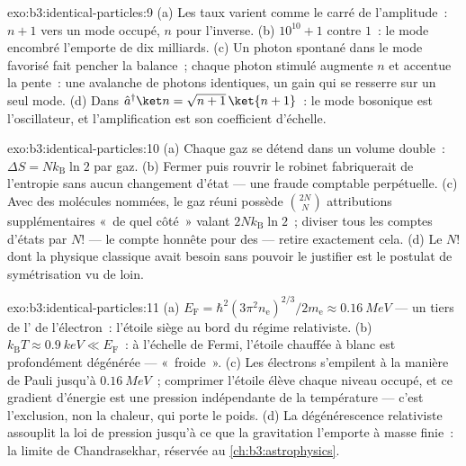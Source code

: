 \begin{solution}{exo:b3:identical-particles:9}
(a) Les taux varient comme le carré de l'amplitude~: $n + 1$ vers un
mode occupé, $n$ pour l'inverse. (b) $10^{10} + 1$ contre $1$~: le
mode encombré l'emporte de dix milliards. (c) Un photon spontané dans
le mode favorisé fait pencher la balance~; chaque photon stimulé
augmente $n$ et accentue la pente~: une avalanche de photons
identiques, un gain qui se resserre sur un seul mode. (d) Dans $\hat a^\dagger\ket n =
\sqrt{n+1}\,\ket{n+1}$~: le mode bosonique est l'oscillateur, et
l'amplification est son coefficient d'échelle.
\end{solution}

\begin{solution}{exo:b3:identical-particles:10}
(a) Chaque gaz se détend dans un volume double~: $\Delta S =
Nk_{\text{B}}\ln2$ par gaz. (b) Fermer puis rouvrir le robinet
fabriquerait de l'entropie sans aucun changement d'état --- une fraude
comptable perpétuelle. (c) Avec des molécules nommées, le gaz réuni
possède $\binom{2N}{N}$ attributions supplémentaires «~de quel côté~»
valant $2Nk_{\text{B}}\ln2$~; diviser tous les comptes d'états par
$N!$ --- le compte honnête pour des  --- retire
exactement cela. (d) Le $N!$ dont la physique classique avait besoin
sans pouvoir le justifier est le postulat de symétrisation vu de loin.
\end{solution}

\begin{solution}{exo:b3:identical-particles:11}
(a) $E_{\text{F}} = \hbar^2(3\pi^2n_{\text{e}})^{2/3}/2m_{\text{e}}
\approx \qty{0.16}{MeV}$ --- un tiers de l' de
l'électron~: l'étoile siège au bord du régime relativiste. (b)
$k_{\text{B}}T \approx \qty{0.9}{keV} \ll E_{\text{F}}$~: à l'échelle
de Fermi, l'étoile chauffée à blanc est profondément dégénérée ---
«~froide~». (c) Les électrons s'empilent à la manière de Pauli jusqu'à
$\qty{0.16}{MeV}$~; comprimer l'étoile élève chaque niveau occupé, et
ce gradient d'énergie est une pression indépendante de la
température --- c'est l'exclusion, non la chaleur, qui porte le poids.
(d) La dégénérescence relativiste assouplit la loi de pression jusqu'à
ce que la gravitation l'emporte à masse finie~: la limite de
Chandrasekhar, réservée au \cref{ch:b3:astrophysics}.
\end{solution}


